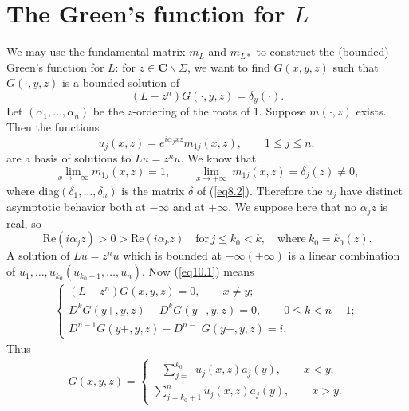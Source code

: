 \documentclass{surv-l}
\theoremstyle{plain}
\theoremstyle{definition}
\numberwithin{equation}{chapter}
\begin{document}
\section{The Green's function for $L$}\label{sec10}We may use the fundamental matrix $m_{L}$ and $m_{L*}$ to construct the (bounded) Green's function for $L$: for $ z\in \mathbf{C}\backslash \Sigma$, we want to find $G(x, y, z)$ such that $G(\cdot,y, z)$ is a bounded solution of
\setcounter{equation}{0}
\begin{equation}\label{eq10.1}
(L-z^{n})G(\cdot,y,z)=\delta_{y}(\cdot).
\end{equation}
Let $(\alpha_{1},\ldots,\alpha_{n})$ be the $z$-ordering of the roots of 1. Suppose $m(\cdot, z)$ exists. Then the functions
\begin{equation}\label{eq10.2}
u_{j}(x,z) = e^{i\alpha_{j}xz}m_{1j}(x, z),\qquad 1 \leq j \leq n,
\end{equation}
are a basis of solutions to $Lu=z^{n}u$. We know that
\begin{equation*}
\lim_{x\rightarrow-\infty} m_{1j}(x,z) = 1,\qquad \lim_{x\rightarrow+\infty}\ m_{1j}(x,z) = \delta_{j}(z)\neq 0,
\end{equation*}
where diag$(\delta_{1},\ldots, \delta_{n})$ is the matrix $\delta$ of (\ref{eq8.2}). Therefore the $u_{j}$ have distinct asymptotic behavior both at $-\infty$ and at $+\infty$. We suppose here that no $\alpha_{j}z$ is real, so
\begin{equation}\label{eq10.3}
\mathrm{Re}(i\alpha_{j}z) > 0 > \mathrm{Re}(i\alpha_{k}z)\quad \mathrm{for}\, j \leq k_{0} < k,\quad \mathrm{where}\ k_{0} = k_{0}(z).
\end{equation}
A solution of $Lu=z^{n}u$ which is bounded at $-\infty(+\infty)$ is a linear combination of $u_{1},\ldots, u_{k_{0}} (u_{k_{0}+1},\ldots, u_{n})$. Now (\ref{eq10.1}) means
\begin{align}\label{eq10.4}
\left\{\begin{array}{lll}
(L-z^{n})G(x, y, z)= 0,\qquad x\neq y;\\
D^{k}G(y+, y,z)- D^{k}G(y-, y,z) = 0,\qquad 0\leq k<n-1;\\
D^{n-1}G(y+, y, z)-D^{n-1}G(y-, y, z)=i.
\end{array}\right.
\end{align}
Thus
\begin{align}\label{eq10.5}
G(x,y,z)=\left\{\begin{array}{l}
-\sum_{j=1}^{k_{0}}u_{j}(x, z)a_{j}(y),\qquad x<y;\\
\sum_{j=k_{0}+1}^{n}u_{j}(x, z)a_{j}(y),\qquad x>y.
\end{array}\right.
\end{align}
\end{document}
